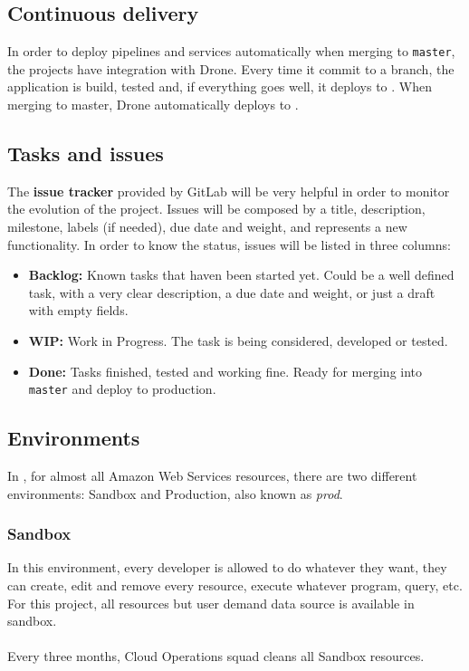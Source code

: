 \subsection{Continuous delivery}

In order to deploy pipelines and services automatically when merging to \texttt{master}, the projects have integration with Drone\cite{drone}. Every time it commit to a branch, the application is build, tested and, if everything goes well, it deploys to . When merging to master, Drone automatically deploys to .

\subsection{Tasks and issues}

The \textbf{issue tracker} provided by GitLab\cite{gitlab} will be very helpful in order to monitor the evolution of the project. Issues will be composed by a title, description, milestone, labels (if needed), due date and weight, and represents a new functionality. In order to know the status, issues will be listed in three columns:

\begin{itemize}
    \item \textbf{Backlog:} Known tasks that haven been started yet. Could be a well defined task, with a very clear description, a due date and weight, or just a draft with empty fields.
    \item \textbf{WIP:} Work in Progress. The task is being considered, developed or tested.
    \item \textbf{Done:} Tasks finished, tested and working fine. Ready for merging into \texttt{master} and deploy to production.
\end{itemize}

\subsection{Environments} \label{environments}

In \company, for almost all Amazon Web Services resources, there are two different environments: Sandbox and Production, also known as \textit{prod}.

\subsubsection*{Sandbox} \label{sandbox}

In this environment, every developer is allowed to do whatever they want, they can create, edit and remove every resource, execute whatever program, query, etc. For this project, all resources but user demand data source is available in sandbox.
\\\\
Every three months, Cloud Operations squad cleans all Sandbox resources.

